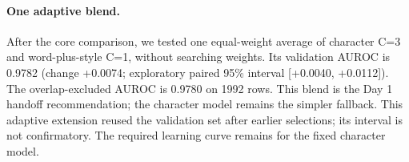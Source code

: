 \paragraph{One adaptive blend.}

After the core comparison, we tested one equal-weight average of character C=3 and word-plus-style C=1, without searching weights. Its validation AUROC is 0.9782 (change +0.0074; exploratory paired 95\% interval [+0.0040, +0.0112]). The overlap-excluded AUROC is 0.9780 on 1992 rows. This blend is the Day 1 handoff recommendation; the character model remains the simpler fallback. This adaptive extension reused the validation set after earlier selections; its interval is not confirmatory. The required learning curve remains for the fixed character model.

